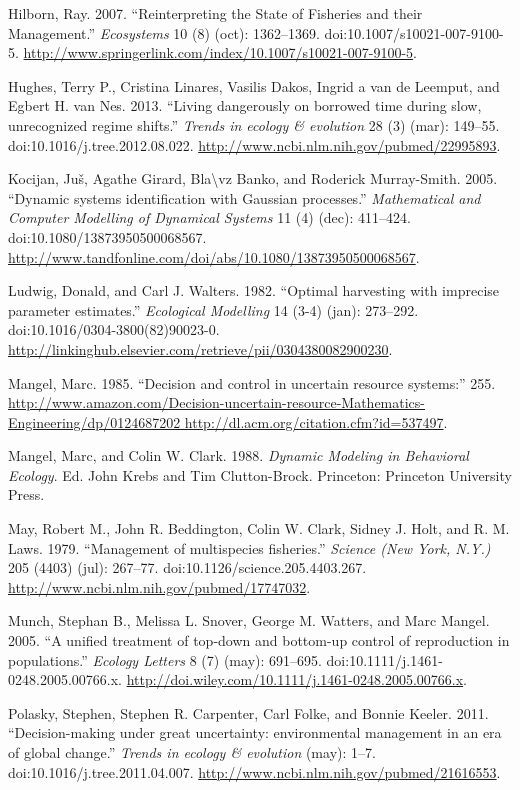 \documentclass[author-year, review]{elsarticle} %
\begin{document}
Hilborn, Ray. 2007. ``Reinterpreting the State of Fisheries and their
Management.'' \emph{Ecosystems} 10 (8) (oct): 1362--1369.
doi:10.1007/s10021-007-9100-5.
\url{http://www.springerlink.com/index/10.1007/s10021-007-9100-5}.

Hughes, Terry P., Cristina Linares, Vasilis Dakos, Ingrid a van de
Leemput, and Egbert H. van Nes. 2013. ``Living dangerously on borrowed
time during slow, unrecognized regime shifts.'' \emph{Trends in ecology
\& evolution} 28 (3) (mar): 149--55. doi:10.1016/j.tree.2012.08.022.
\url{http://www.ncbi.nlm.nih.gov/pubmed/22995893}.

Kocijan, Juš, Agathe Girard, Bla\textbackslash{}vz Banko, and Roderick
Murray-Smith. 2005. ``Dynamic systems identification with Gaussian
processes.'' \emph{Mathematical and Computer Modelling of Dynamical
Systems} 11 (4) (dec): 411--424. doi:10.1080/13873950500068567.
\url{http://www.tandfonline.com/doi/abs/10.1080/13873950500068567}.

Ludwig, Donald, and Carl J. Walters. 1982. ``Optimal harvesting with
imprecise parameter estimates.'' \emph{Ecological Modelling} 14 (3-4)
(jan): 273--292. doi:10.1016/0304-3800(82)90023-0.
\url{http://linkinghub.elsevier.com/retrieve/pii/0304380082900230}.

Mangel, Marc. 1985. ``Decision and control in uncertain resource
systems:'' 255.
\href{http://www.amazon.com/Decision-uncertain-resource-Mathematics-Engineering/dp/0124687202 http://dl.acm.org/citation.cfm?id=537497}{http://www.amazon.com/Decision-uncertain-resource-Mathematics-Engineering/dp/0124687202
http://dl.acm.org/citation.cfm?id=537497}.

Mangel, Marc, and Colin W. Clark. 1988. \emph{Dynamic Modeling in
Behavioral Ecology}. Ed. John Krebs and Tim Clutton-Brock. Princeton:
Princeton University Press.

May, Robert M., John R. Beddington, Colin W. Clark, Sidney J. Holt, and
R. M. Laws. 1979. ``Management of multispecies fisheries.''
\emph{Science (New York, N.Y.)} 205 (4403) (jul): 267--77.
doi:10.1126/science.205.4403.267.
\url{http://www.ncbi.nlm.nih.gov/pubmed/17747032}.

Munch, Stephan B., Melissa L. Snover, George M. Watters, and Marc
Mangel. 2005. ``A unified treatment of top-down and bottom-up control of
reproduction in populations.'' \emph{Ecology Letters} 8 (7) (may):
691--695. doi:10.1111/j.1461-0248.2005.00766.x.
\url{http://doi.wiley.com/10.1111/j.1461-0248.2005.00766.x}.

Polasky, Stephen, Stephen R. Carpenter, Carl Folke, and Bonnie Keeler.
2011. ``Decision-making under great uncertainty: environmental
management in an era of global change.'' \emph{Trends in ecology \&
evolution} (may): 1--7. doi:10.1016/j.tree.2011.04.007.
\url{http://www.ncbi.nlm.nih.gov/pubmed/21616553}.
\end{document}
